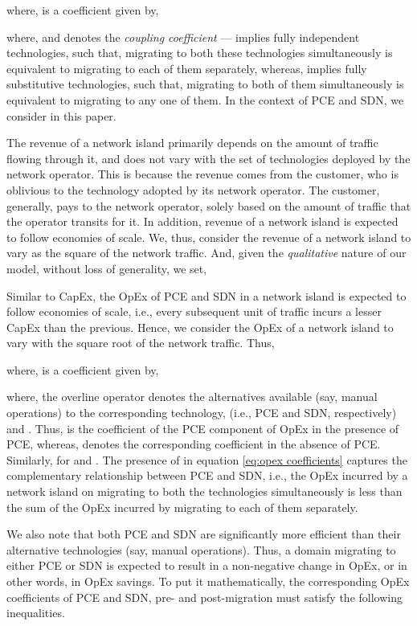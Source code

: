 \documentclass[smallextended]{svjour3}
\begin{document}
where,  is a coefficient given by,

where,  and  denotes the \emph{coupling coefficient} ---
 implies fully independent technologies, such that, migrating to
both these technologies simultaneously is equivalent to migrating to each of
them separately, whereas,  implies fully substitutive
technologies, such that, migrating to both of them simultaneously is equivalent to
migrating to any one of them. In the context of PCE and SDN, we consider
 in this paper.

\par The revenue of a network island primarily depends on the amount of traffic
flowing through it, and does not vary with the set of technologies deployed by
the network operator. This is because the revenue comes from the customer, who
is oblivious to the technology adopted by its network operator. The customer,
generally, pays to the network operator, solely based on the amount of traffic
that the operator transits for it. In addition, revenue of a network island is
expected to follow economies of scale.
We, thus, consider the revenue of a network island to vary as the square of the
network traffic.
And, given the \emph{qualitative} nature of our model, without loss of
generality, we set,


Similar to CapEx, the OpEx of PCE and SDN in a network island is expected to
follow economies of scale, i.e.,  every subsequent unit of traffic incurs a lesser
CapEx than the previous. Hence, we consider the OpEx of a network island to vary
with the square root of the network traffic. Thus,

where,  is a coefficient given by,

where, the overline operator  denotes the alternatives available (say, manual
operations) to the corresponding
technology, (i.e.,  PCE and SDN, respectively) and . Thus,  is the coefficient of
the PCE component of OpEx in the presence of PCE, whereas,
 denotes the corresponding coefficient in the
absence of PCE. Similarly, for  and
. The presence of  in equation
\eqref{eq:opex coefficients} captures the complementary relationship between
PCE and SDN, i.e.,  the OpEx incurred by a network
island on migrating to both the technologies simultaneously is
less than the sum of the OpEx incurred by migrating to each
of them separately.

\par We also note that both PCE and SDN are significantly more efficient than
their alternative technologies (say, manual operations). Thus, a domain
migrating to either PCE or SDN is expected to result in a non-negative change in
OpEx, or in other words, in OpEx savings. To put it mathematically, the
corresponding OpEx coefficients of PCE and SDN, pre- and post-migration must
satisfy the following inequalities.
\end{document}

